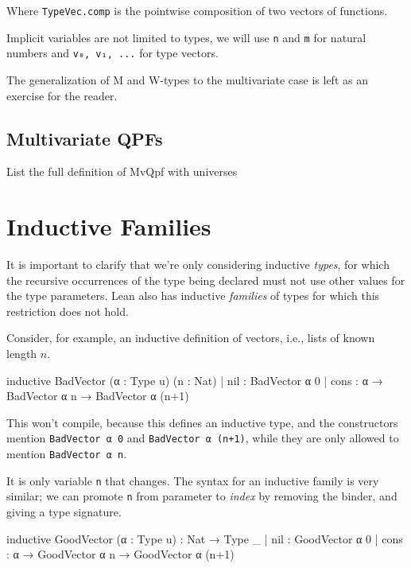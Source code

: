 \documentclass[titlepage]{report}
\newenvironment{remark}{%
\begin{framed}
\begin{trivlist}
    \item[\hskip \labelsep {\bfseries Remark:}]}%
{%
\end{trivlist}%
\end{framed}
}
\newenvironment{todo}{%
\definecolor{shadecolor}{HTML}{F8E0E0}%
\begin{shaded}%
\begin{trivlist}                         
    \item[\hskip \labelsep {\bfseries Todo:}]}{\end{trivlist}\end{shaded}}
\begin{document}
Where \texttt{TypeVec.comp} is the pointwise composition of two vectors of functions.

\begin{remark}
    Implicit variables are not limited to types, we will use \texttt{n} and \texttt{m} for natural numbers and \texttt{v₀, v₁, ...} for type vectors.
\end{remark}

The generalization of M and W-types to the multivariate case is left as an exercise for the reader.

\subsection{Multivariate QPFs}

\begin{todo}
    List the full definition of MvQpf with universes
\end{todo}


\section{Inductive Families}
It is important to clarify that we're only considering inductive \emph{types}, 
for which the recursive occurrences of the type being declared must not use other values for the type parameters. Lean also has inductive \emph{families} of types for which this restriction does not hold.

Consider, for example, an inductive definition of vectors, i.e., lists of known length $n$.
\begin{badleancode}
    inductive BadVector (α : Type u) (n : Nat)
    | nil   : BadVector α 0
    | cons  : α → BadVector α n → BadVector α (n+1)
\end{badleancode}

This won't compile, because this defines an inductive type, and the constructors mention \texttt{BadVector α 0} and \texttt{BadVector α (n+1)}, while they are only allowed to mention \texttt{BadVector α n}.

It is only variable \texttt{n} that changes. The syntax for an inductive family is very similar; we can promote \texttt{n} from parameter to \emph{index} by removing the binder, and giving a type signature.

\begin{leancode}
    inductive GoodVector (α : Type u) : Nat → Type _
    | nil   : GoodVector α 0
    | cons  : α → GoodVector α n → GoodVector α (n+1)
\end{leancode}
\end{document}
